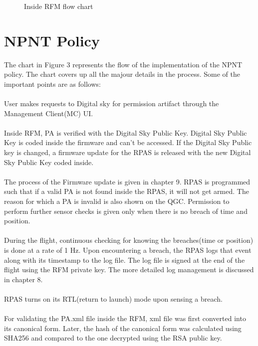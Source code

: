 \documentclass[18pt]{article}
\begin{document}
\begin{figure}
\begin{tikzpicture}[node distance = 2cm, auto]
 	 
 	 
 	 
 	
 	
  
 	
 	
 
 
 	
 	\end{tikzpicture}
 	\caption{Inside RFM flow chart }
 \end{figure}

\newpage
\section{NPNT Policy}
The chart in Figure 3 represents the flow of the implementation of the NPNT policy. The chart covers up all the majour details in the process. Some of the important points are as follows:\\
\\
User makes requests to Digital sky for permission artifact through the Management Client(MC) UI.\\
\\
Inside RFM, PA is verified with the Digital Sky Public Key. Digital Sky Public Key is coded inside the firmware and can't be accessed. If the Digital Sky Public key is changed,  a firmware update for the RPAS is released with the new Digital Sky Public Key coded inside.\\
\\
The process of the Firmware update is given in chapter 9. RPAS is programmed such that if a valid PA is not found inside the RPAS, it will not get armed. The reason for which a PA is invalid is also shown on the QGC.
Permission to perform further sensor checks is given only when there is no breach of time and position.\\
\\
During the flight, continuous checking for knowing the breaches(time or position) is done at a rate of 1 Hz. Upon encountering a breach, the RPAS logs that event along with its timestamp to the log file. The log file is signed at the end of the flight using the RFM private key. The more detailed log management is discussed in chapter 8.\\
\\
RPAS turns on its RTL(return to launch) mode upon sensing a breach. \\
\\
For validating the PA.xml file inside the RFM, xml file was first converted into its canonical form. Later, the hash of the canonical form was calculated using SHA256 and compared to the one decrypted using the RSA public key.\\
\end{document}
